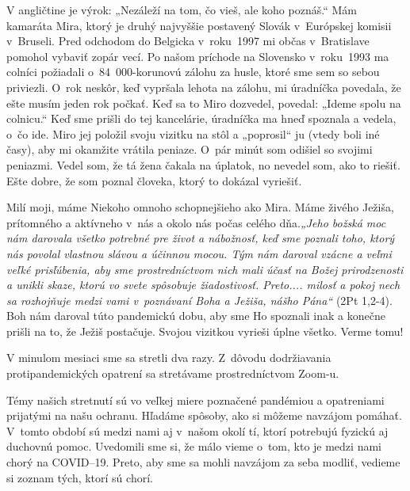 


V angličtine je výrok: „Nezáleží na tom, čo vieš, ale koho poznáš.“ Mám kamaráta Mira, ktorý je druhý najvyššie postavený Slovák v~Európskej komisii v~Bruseli. Pred odchodom do Belgicka v~roku~1997 mi občas v~Bratislave pomohol vybaviť zopár vecí. Po našom príchode na Slovensko v~roku~1993 ma colníci požiadali o~84~000-korunovú zálohu za husle, ktoré sme sem so sebou priviezli. O~rok neskôr, keď vypršala lehota na zálohu, mi úradníčka povedala, že ešte musím jeden rok počkať. Keď sa to Miro dozvedel, povedal: „Ideme spolu na colnicu.“ Keď sme prišli do tej kancelárie, úradníčka ma hneď spoznala a vedela, o~čo ide. Miro jej položil svoju vizitku na stôl a „poprosil“ ju (vtedy boli iné časy), aby mi okamžite vrátila peniaze. O~pár minút som odišiel so svojimi peniazmi. Vedel som, že tá žena čakala na úplatok, no nevedel som, ako to riešiť. Ešte dobre, že som poznal človeka, ktorý to dokázal vyriešiť.

Milí moji, máme Niekoho omnoho schopnejšieho ako Mira. Máme živého Ježiša, prítomného a aktívneho v~nás a okolo nás počas celého dňa.{\it „Jeho božská moc nám darovala všetko potrebné pre život a nábožnosť, keď sme poznali toho, ktorý nás povolal vlastnou slávou a účinnou mocou. Tým nám daroval vzácne a veľmi veľké prisľúbenia, aby sme prostredníctvom nich mali účasť na Božej prirodzenosti a unikli skaze, ktorú vo svete spôsobuje žiadostivosť. Preto.... milosť a pokoj nech sa rozhojňuje medzi vami v~poznávaní Boha a Ježiša, nášho Pána“} (2Pt 1,2-4). Boh nám daroval túto pandemickú dobu, aby sme Ho spoznali inak a konečne prišli na to, že Ježiš postačuje. Svojou vizitkou vyrieši úplne všetko. Verme tomu!



V minulom mesiaci sme sa stretli dva razy. Z~dôvodu dodržiavania protipandemických opatrení sa stretávame prostredníctvom Zoom-u.

Témy našich stretnutí sú vo veľkej miere poznačené pandémiou a opatreniami prijatými na našu ochranu. Hľadáme spôsoby, ako si môžeme navzájom pomáhať. V~tomto období sú medzi nami aj v~našom okolí tí, ktorí potrebujú fyzickú aj duchovnú pomoc. Uvedomili sme si, že málo vieme o~tom, kto je medzi nami chorý na COVID--19. Preto, aby sme sa mohli navzájom za seba modliť, vedieme si zoznam tých, ktorí sú chorí.

